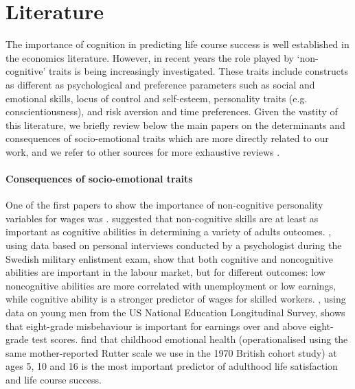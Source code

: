 \section{Literature \label{sec:lit}}

The importance of cognition in predicting life course success is well established in the economics literature. However, in recent years the role played by `non-cognitive' traits is being increasingly investigated. These traits include constructs as different as psychological and preference parameters such as social and emotional skills, locus of control and self-esteem, personality traits (e.g. conscientiousness), and risk aversion and time preferences. Given the vastity of this literature, we briefly review below the main papers on the determinants and consequences of socio-emotional traits which are more directly related to our work, and we refer to other sources for more exhaustive reviews \citep{borghans2008economics,almlund2011personality,goodman2015social,kautz2014fostering}.

\paragraph{Consequences of socio-emotional traits} One of the first papers to show the importance of non-cognitive personality variables for wages was \citet{bowles2001determinants}. \citet{heckman2006effects} suggested that non-cognitive skills are at least as important as cognitive abilities in determining a variety of adults outcomes. \citet{lindqvist2011labor}, using data based on personal interviews conducted by a psychologist during the Swedish military enlistment exam, show that both cognitive and noncognitive abilities are important in the labour market, but for different outcomes: low noncognitive abilities are more correlated with unemployment or low earnings, while cognitive ability is a stronger predictor of wages for skilled workers. \citet{segal2013misbehavior}, using data on young men from the US National Education Longitudinal Survey, shows that eight-grade misbehaviour is important for earnings over and above eight-grade test scores. \citet{layard2014predicts} find that childhood emotional health (operationalised using the same mother-reported Rutter scale we use in the 1970 British cohort study) at ages 5, 10 and 16 is the most important predictor of adulthood life satisfaction and life course success.

